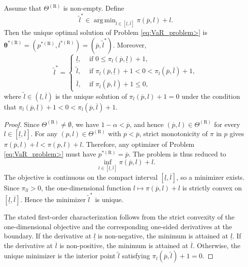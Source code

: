 \documentclass[a4paper,12pt]{article}
\DeclareMathOperator*{\argmin}{arg\,min}
\begin{document}
\begin{proposition}\label{lemma:VaR_problem>}
Assume that $\Theta^{\left(\text{R}\right)}$ is non-empty. Define
\begin{equation}
\tilde{l}^*\in\argmin_{l\in\left[\underline{l},\overline{l}\right]}\pi\left(\overline{p},l\right)+l.
\label{eq:VaR_argmin}
\end{equation}
Then the unique optimal solution of Problem \eqref{eq:VaR_problem>} is ${\bm\theta}^{*\left(\text{R}\right)}=\left(p^{*\left(\text{R}\right)},l^{*\left(\text{R}\right)}\right)=\left(\overline{p},\tilde{l}^*\right)$. Moreover,
\begin{equation*}
\tilde{l}^*=
\begin{cases}
\underline{l},&\text{ if }0\leq \pi_l\left(\overline{p},\underline{l}\right)+1,\\
\tilde{l},&\text{ if }\pi_l\left(\overline{p},\underline{l}\right)+1<0<\pi_l\left(\overline{p},\overline{l}\right)+1,\\
\overline{l},&\text{ if }\pi_l\left(\overline{p},\overline{l}\right)+1\leq 0,
\end{cases}
\end{equation*}
where $\tilde{l}\in\left(\underline{l},\overline{l}\right)$ is the unique solution of $\pi_l\left(\overline{p},l\right)+1=0$ under the condition that $\pi_l\left(\overline{p},\underline{l}\right)+1<0<\pi_l\left(\overline{p},\overline{l}\right)+1$.
\end{proposition}
\begin{proof}
Since $\Theta^{\left(\text{R}\right)}\neq\emptyset$, we have $1-\alpha<\overline{p}$, and hence $\left(\overline{p},l\right)\in\Theta^{\left(\text{R}\right)}$ for every $l\in\left[\underline{l},\overline{l}\right]$. For any $\left(p,l\right)\in\Theta^{\left(\text{R}\right)}$ with $p<\overline{p}$, strict monotonicity of $\pi$ in $p$ gives $\pi\left(\overline{p},l\right)+l<\pi\left(p,l\right)+l$. Therefore, any optimizer of Problem \eqref{eq:VaR_problem>} must have $p^{*\left(\text{R}\right)}=\overline{p}$. The problem is thus reduced to
\begin{equation}
\inf_{l\in\left[\underline{l},\overline{l}\right]}\pi\left(\overline{p},l\right)+l.
\label{eq:var_one_dim_severity_problem}
\end{equation}
The objective is continuous on the compact interval $\left[\underline{l},\overline{l}\right]$, so a minimizer exists. Since $\pi_{ll}>0$, the one-dimensional function $l\mapsto \pi\left(\overline{p},l\right)+l$ is strictly convex on $\left[\underline{l},\overline{l}\right]$. Hence the minimizer $\tilde{l}^*$ is unique.

The stated first-order characterization follows from the strict convexity of the one-dimensional objective and the corresponding one-sided derivatives at the boundary. If the derivative at $\underline{l}$ is non-negative, the minimum is attained at $\underline{l}$. If the derivative at $\overline{l}$ is non-positive, the minimum is attained at $\overline{l}$. Otherwise, the unique minimizer is the interior point $\tilde{l}$ satisfying $\pi_l\left(\overline p,\tilde{l}\right)+1=0$.
\end{proof}
\end{document}
